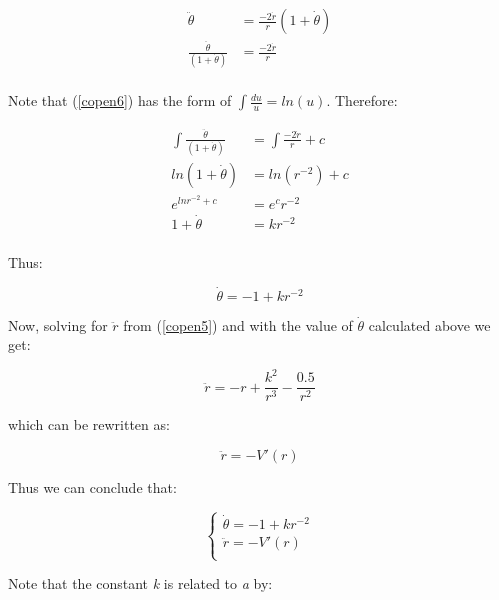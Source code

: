 \documentclass{article}
\begin{document}
\begin{equation}\label{copen6}
\begin{split}
\ddot{\theta} & = \frac{-2\dot{r}}{r} (1+\dot{\theta})\\
\frac{\ddot{\theta}}{(1+\dot{\theta})} &=\frac{-2\dot{r}}{r}\\
\end{split}
\end{equation}

\newpage

Note that (\ref{copen6}) has the form of $\int \frac{du}{u} = ln(u)$. Therefore:

\begin{equation}\label{copen7}
\begin{split}
\int \frac{\ddot{\theta}}{(1+\dot{\theta})} &= \int \frac{-2\dot{r}}{r} + c\\
ln (1+\dot{\theta}) &= ln(r^{-2}) + c \\
e^{lnr^{-2}+c} &= e^c r^{-2} \\
1+\dot{\theta} &= kr^{-2} \\
\end{split}
\end{equation}

Thus:

\begin{equation}\label{copen8}
\dot{\theta} = -1 + kr^{-2}
\end{equation}

Now, solving for $\ddot{r}$ from (\ref{copen5}) and with the value of $\dot{\theta}$ calculated above we get:

\begin{equation}\label{copen9}
\ddot{r} = -r + \frac{k^2}{r^{3}} - \frac{0.5}{r^2}
\end{equation}

which can be rewritten as:

\begin{equation}\label{copen10}
\ddot{r} = -V'(r)
\end{equation}

Thus we can conclude that:

\begin{equation}\label{copen10}
\begin{cases}
\dot{\theta} = -1 + kr^{-2} \\
\ddot{r} = -V'(r) \\
\end{cases}
\end{equation}

Note that the constant \textit{k} is related to \textit{a} by:
\end{document}
